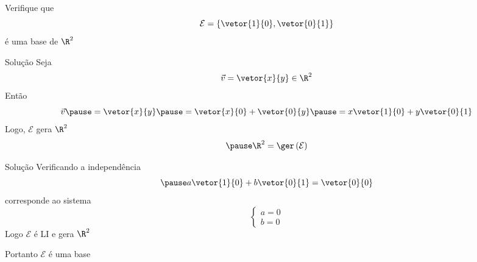 \begin{question}
  Verifique que
  \[
    \mathcal{E} = \left\{
      \vetor{1}{0},
      \vetor{0}{1}
    \right\}
  \]
  é uma base de $\R^{2}$
\end{question}

\begin{resolution}{Solução}
  Seja
  \[
    \vec{v} = \vetor{x}{y} \in \R^{2}
  \]
  \pause
  Então
  \[
    \vec{v}
    \pause
    = \vetor{x}{y}
    \pause
    = \vetor{x}{0} + \vetor{0}{y}
    \pause
    = x \vetor{1}{0} + y \vetor{0}{1}
  \]
  \pause
  Logo, $\mathcal{E}$ gera $\R^2$
  \[
    \pause
    \R^2 = \ger\left(\mathcal{E}\right)
  \]
\end{resolution}

\begin{resolution}{Solução}
  Verificando a independência
  \[
    \pause
    a \vetor{1}{0} + b \vetor{0}{1} = \vetor{0}{0}
  \]
  \pause
  corresponde ao sistema
  \[
    \begin{cases}
      a = 0 \\
      b = 0
    \end{cases}
  \]
  \pause
  Logo $\mathcal{E}$ é LI e gera $\R^{2}$

  \pause
  Portanto $\mathcal{E}$ é uma base
\end{resolution}

\endinput
